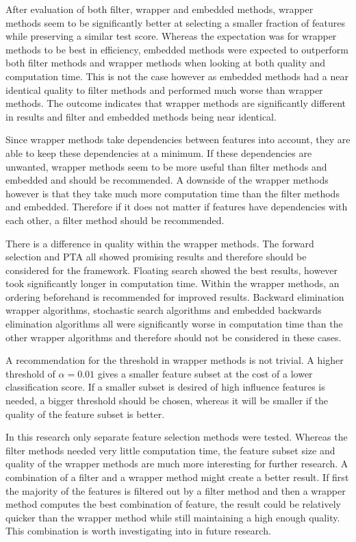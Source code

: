 \documentclass[10pt,a4paper]{article}
\begin{document}
	After evaluation of both filter, wrapper and embedded methods, wrapper methods seem to be significantly better at selecting a smaller fraction of features while preserving a similar test score.  Whereas the expectation was for wrapper methods to be best in efficiency, embedded methods were expected to outperform both filter methods and wrapper methods when looking at both quality and computation time. This is not the case however as embedded methods had a near identical quality to filter methods and performed much worse than wrapper methods. The outcome indicates that wrapper methods are significantly different in results and filter and embedded methods being near identical.
	
	Since wrapper methods take dependencies between features into account, they are able to keep these dependencies at a minimum. If these dependencies are unwanted, wrapper methods seem to be more useful than filter methods and embedded and should be recommended. A downside of the wrapper methods however is that they take much more computation time than the filter methods and embedded. Therefore if it does not matter if features have dependencies with each other, a filter method should be recommended.
	
	There is a difference in quality within the wrapper methods. The forward selection and PTA all showed promising results and therefore should be considered for the framework. Floating search showed the best results, however took significantly longer in computation time. Within the wrapper methods, an ordering beforehand is recommended for improved results. Backward elimination wrapper algorithms, stochastic search algorithms and embedded backwards elimination algorithms all were significantly worse in computation time than the other wrapper algorithms and therefore should not be considered in these cases.
	
	A recommendation for the threshold in wrapper methods is not trivial. A higher threshold of $\alpha = 0.01$ gives a smaller feature subset at the cost of a lower classification score. If a smaller subset is desired of high influence features is needed, a bigger threshold should be chosen, whereas it will be smaller if the quality of the feature subset is better.
	
	In this research only separate feature selection methods were tested. Whereas the filter methods needed very little computation time, the feature subset size and quality of the wrapper methods are much more interesting for further research. A combination of a filter and a wrapper method might create a better result. If first the majority of the features is filtered out by a filter method and then a wrapper method computes the best combination of feature, the result could be relatively quicker than the wrapper method while still maintaining a high enough quality. This combination is worth investigating into in future research.
	
\end{document}
